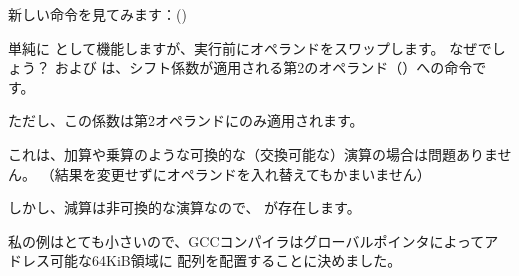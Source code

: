 新しい命令を見てみます：\RSB ()

単純に \SUB として機能しますが、実行前にオペランドをスワップします。
なぜでしょう？
\SUB および \RSB は、シフト係数が適用される第2のオペランド（）への命令です。

ただし、この係数は第2オペランドにのみ適用されます。

これは、加算や乗算のような可換的な（交換可能な）演算の場合は問題ありません。
（結果を変更せずにオペランドを入れ替えてもかまいません）

しかし、減算は非可換的な演算なので、 \RSB が存在します。


私の例はとても小さいので、GCCコンパイラはグローバルポインタによってアドレス可能な64KiB領域に
配列を配置することに決めました。



